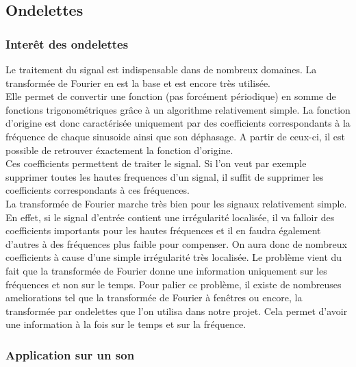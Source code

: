 \documentclass[a4paper,12pt]{article}
\begin{document}
	\subsection{Ondelettes}

        	\subsubsection{Interêt des ondelettes}

Le traitement du signal est indispensable dans de nombreux domaines. La
transformée de Fourier en est la base et est encore très utilisée.\\
Elle permet de convertir une fonction (pas forcément périodique) en somme de
fonctions trigonométriques grâce à un algorithme relativement simple. La
fonction d'origine est donc caractérisée uniquement par des coefficients correspondants à
la fréquence de chaque sinusoide ainsi que son déphasage. A partir de ceux-ci,
il est possible de retrouver éxactement la fonction d'origine.\\
Ces coefficients permettent de traiter le signal. Si l'on veut par exemple
supprimer toutes les hautes frequences d'un signal, il suffit de supprimer les
coefficients correspondants à ces fréquences.\\
La transformée de Fourier marche très bien pour les signaux relativement simple.
En effet, si le signal d'entrée contient une irrégularité localisée, il va
falloir des coefficients importants pour les hautes fréquences et il en faudra
également d'autres à des fréquences plus faible pour compenser. On aura donc de
nombreux coefficients à cause d'une simple irrégularité très localisée. Le
problème vient du fait que la transformée de Fourier donne une information
uniquement sur les fréquences et non sur le temps. Pour palier ce problème, il
existe de nombreuses ameliorations tel que la transformée de Fourier à fenêtres
ou encore, la transformée par ondelettes que l'on utilisa dans notre projet.
Cela permet d'avoir une information à la fois sur le temps et sur la
fréquence.\\

		\subsubsection{Application sur un son}
\end{document}
